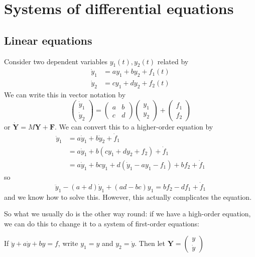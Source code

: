 \documentclass[a4paper]{article}
\begin{document}
\section{Systems of differential equations}
\subsection{Linear equations}
Consider two dependent variables $y_1(t), y_2(t)$ related by
\begin{align*}
  \dot y_1 &= ay_1 + by_2 + f_1(t)\\
  \dot y_2 &= cy_1 + dy_2 + f_2(t)
\end{align*}
We can write this in vector notation by
\[
  \begin{pmatrix}
    \dot y_1\\\dot y_2
  \end{pmatrix} =
  \begin{pmatrix}
    a & b\\
    c & d
  \end{pmatrix}
  \begin{pmatrix}
    y_1\\y_2
  \end{pmatrix}
  +
  \begin{pmatrix}
    f_1\\f_2
  \end{pmatrix}
\]
or $\mathbf{\dot Y} = M\mathbf{Y} + \mathbf{F}$. We can convert this to a higher-order equation by
\begin{align*}
  \ddot y_1 &= a\dot y_1 + b\dot y_2 + \dot f_1\\
  &= a\dot y_1 + b(cy_1 + dy_2 + f_2) + \dot f_1\\
  &= a\dot y_1 + bcy_1 + d(\dot y_1 - ay_1 - f_1) + bf_2 + \dot f_1
\end{align*}
so
\[
  \ddot y_1 - (a + d)\dot y_1 + (ad - bc) y_1 = bf_2 - df_1 + \dot f_1
\]
and we know how to solve this. However, this actually complicates the equation.

So what we usually do is the other way round: if we have a high-order equation, we can do this to change it to a system of first-order equations:

If $\ddot y + a\dot y + by = f$, write $y_1 = y$ and $y_2 = \dot y$. Then let $\mathbf{Y} =
\begin{pmatrix}
  y\\\dot y
\end{pmatrix}$
\end{document}
